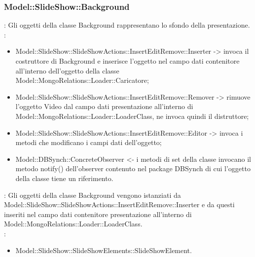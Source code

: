 {                 \subsubsection{Model::\-SlideShow::\-Background}{
                				\textbf{\tipo}: Gli oggetti della classe Background rappresentano lo sfondo della presentazione.\\
                				\textbf{\relaz}: 
                				\begin{itemize}
                					\item Model::\-SlideShow::\-SlideShowActions::\-InsertEditRemove::\-Inserter -> invoca il costruttore di Background e inserisce l’oggetto nel campo dati contenitore all’interno dell’oggetto della classe Model::\-MongoRelations::\-Loader::\-Caricatore;
                                    \item Model::\-SlideShow::\-SlideShowActions::\-InsertEditRemove::\-Remover -> rimuove l’oggetto Video dal campo dati presentazione all’interno di Model::\-MongoRelations::\-Loader::\-LoaderClass, ne invoca quindi il distruttore;
                                    \item Model::\-SlideShow::\-SlideShowActions::\-InsertEditRemove::\-Editor -> invoca i metodi che modificano i campi dati dell'oggetto;
                    \item Model::\-DBSynch::\-ConcreteObserver <- i metodi di set della classe invocano il metodo notify() dell'observer contenuto nel package DBSynch di cui l'oggetto della classe tiene un riferimento.
                				\end{itemize}	
                                \textbf{\interfacce}: Gli oggetti della classe Background vengono istanziati da Model::\-SlideShow::\-SlideShowActions::\-InsertEditRemove::\-Inserter e da questi inseriti nel campo dati contenitore presentazione all’interno di\\ Model::\-MongoRelations::\-Loader::\-LoaderClass.\\
                                \textbf{\base}: 
                                    \begin{itemize}
                                    \item Model::\-SlideShow::\-SlideShowElements::\-SlideShowElement.
                                    \end{itemize}
                                    }              
}



